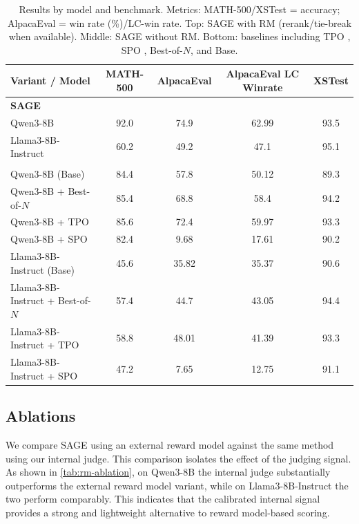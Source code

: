 \documentclass{article}
\theoremstyle{plain}
\theoremstyle{definition}
\theoremstyle{remark}
\newcommand{\method}{SAGE} %
\begin{document}
\begin{table}[t]
\caption{Results by model and benchmark. Metrics: MATH-500/XSTest = accuracy; AlpacaEval = win rate (\%)/LC-win rate. Top: \method{} with RM (rerank/tie-break when available). Middle: \method{} without RM. Bottom: baselines including TPO \citep{litest}, SPO \citep{xiang2025self}, Best-of-\(N\), and Base.}
\label{tab:results-by-model}
\vskip 0.15in
\centering
\begin{small}
\begin{sc}
\begin{tabular}{lcccc}
\toprule
Variant / Model & MATH-500 & AlpacaEval & AlpacaEval LC Winrate & XSTest \\
\midrule
\multicolumn{5}{l}{\textbf{\method{}}} \\
Qwen3-8B & 92.0 & 74.9 & 62.99 & 93.5 \\
Llama3-8B-Instruct & 60.2 & 49.2 & 47.1 & 95.1 \\
\addlinespace
\multicolumn{5}{l}{\textbf{Baselines}} \\
Qwen3-8B (Base) & 84.4 & 57.8 & 50.12 & 89.3 \\
Qwen3-8B + Best-of-\(N\) & 85.4 & 68.8 & 58.4 & 94.2 \\
Qwen3-8B + TPO & 85.6 & 72.4 & 59.97 & 93.3 \\
Qwen3-8B + SPO & 82.4 & 9.68 & 17.61 & 90.2 \\
Llama3-8B-Instruct (Base) & 45.6 & 35.82 & 35.37 & 90.6 \\
Llama3-8B-Instruct + Best-of-\(N\) & 57.4 & 44.7 & 43.05 & 94.4 \\
Llama3-8B-Instruct + TPO & 58.8 & 48.01 & 41.39 & 93.3 \\
Llama3-8B-Instruct + SPO & 47.2 & 7.65 & 12.75 & 91.1 \\
\bottomrule
\end{tabular}
\end{sc}
\end{small}
\vskip -0.1in
\end{table}

\vspace{0.1in}

\subsection{Ablations}
\label{sec:ablations}
We compare \method{} using an external reward model against the same method using our internal judge. This comparison isolates the effect of the judging signal. As shown in \cref{tab:rm-ablation}, on Qwen3-8B the internal judge substantially outperforms the external reward model variant, while on Llama3-8B-Instruct the two perform comparably. This indicates that the calibrated internal signal provides a strong and lightweight alternative to reward model-based scoring.
\end{document}
